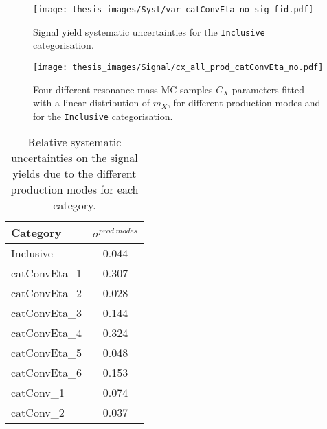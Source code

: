 \documentclass[a4paper, oneside, 11pt, openright]{book}
\begin{document}
\begin{itemize}
 					\begin{center}
 						\begin{figure}
 							\centering
 							\texttt{[image: thesis\_images/Syst/var\_catConvEta\_no\_sig\_fid.pdf]}
 							\caption{Signal yield systematic uncertainties for the \texttt{Inclusive} categorisation.}
 							\label{fig:yield_syst}
 						\end{figure}
 						\begin{figure}
 							\centering
 							\texttt{[image: thesis\_images/Signal/cx\_all\_prod\_catConvEta\_no.pdf]}
 							\caption{Four different resonance mass MC samples $C_X$ parameters fitted with a linear distribution of $m_X$, for different production modes and for the \texttt{Inclusive} categorisation.}
 							\label{fig:prod_mode_syst}
 						\end{figure}
 						\begin{table}[tbp]
 							\centering
 							\begin{tabular}{lc}
 								\toprule[1.5pt]
 								Category		& $\sigma^{prod\ modes}$	\\
 								\midrule
 								Inclusive		& 0.044				\\
 								\midrule
 								catConvEta\_1 	& 0.307				\\
 								catConvEta\_2 	& 0.028				\\
 								catConvEta\_3 	& 0.144				\\
 								catConvEta\_4 	& 0.324				\\
 								catConvEta\_5 	& 0.048				\\
 								catConvEta\_6 	& 0.153				\\
 								\midrule
 								catConv\_1 		& 0.074				\\
 								catConv\_2 		& 0.037				\\
 								\bottomrule[1.5pt]
 							\end{tabular}
 							\caption{Relative systematic uncertainties on the signal yields due to the different production modes for each category.}
 							\label{tab:prod_mode}
 						\end{table}
 					\end{center}
 				\end{itemize} 
\end{document}
